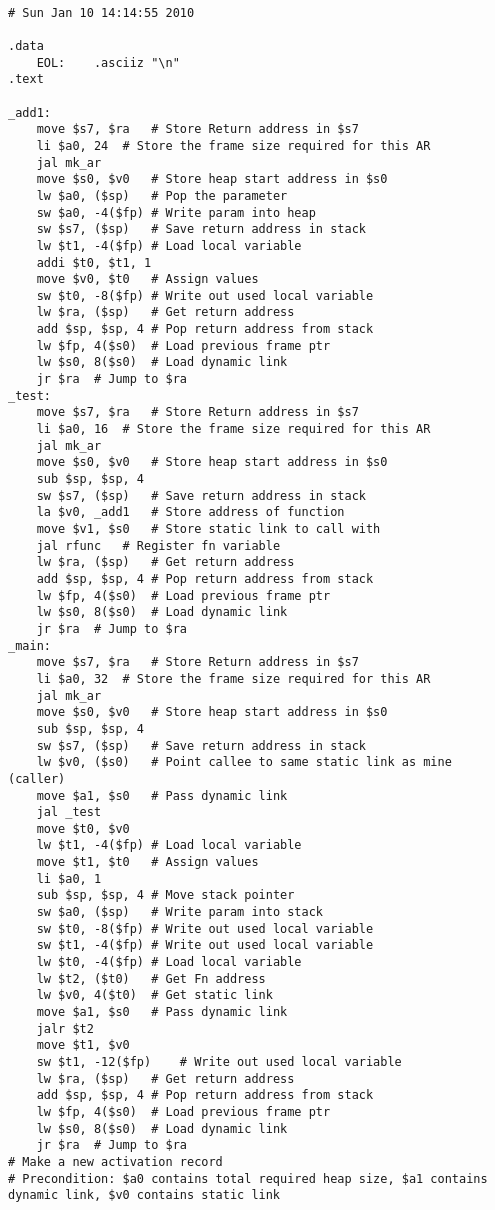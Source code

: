 \begin{lstlisting}[showstringspaces=false,breaklines=true,backgroundcolor=\color{light-gray}, captionpos=b]
         
# Sun Jan 10 14:14:55 2010

.data
	EOL:	.asciiz "\n"
.text

_add1:
	move $s7, $ra	# Store Return address in $s7
	li $a0, 24	# Store the frame size required for this AR
	jal mk_ar
	move $s0, $v0	# Store heap start address in $s0
	lw $a0, ($sp)	# Pop the parameter
	sw $a0, -4($fp)	# Write param into heap
	sw $s7, ($sp)	# Save return address in stack
	lw $t1, -4($fp)	# Load local variable
	addi $t0, $t1, 1
	move $v0, $t0	# Assign values
	sw $t0, -8($fp)	# Write out used local variable
	lw $ra, ($sp)	# Get return address
	add $sp, $sp, 4	# Pop return address from stack
	lw $fp, 4($s0)	# Load previous frame ptr
	lw $s0, 8($s0)	# Load dynamic link
	jr $ra	# Jump to $ra
_test:
	move $s7, $ra	# Store Return address in $s7
	li $a0, 16	# Store the frame size required for this AR
	jal mk_ar
	move $s0, $v0	# Store heap start address in $s0
	sub $sp, $sp, 4
	sw $s7, ($sp)	# Save return address in stack
	la $v0, _add1	# Store address of function
	move $v1, $s0	# Store static link to call with
	jal rfunc	# Register fn variable
	lw $ra, ($sp)	# Get return address
	add $sp, $sp, 4	# Pop return address from stack
	lw $fp, 4($s0)	# Load previous frame ptr
	lw $s0, 8($s0)	# Load dynamic link
	jr $ra	# Jump to $ra
_main:
	move $s7, $ra	# Store Return address in $s7
	li $a0, 32	# Store the frame size required for this AR
	jal mk_ar
	move $s0, $v0	# Store heap start address in $s0
	sub $sp, $sp, 4
	sw $s7, ($sp)	# Save return address in stack
	lw $v0, ($s0)	# Point callee to same static link as mine (caller)
	move $a1, $s0	# Pass dynamic link
	jal _test
	move $t0, $v0
	lw $t1, -4($fp)	# Load local variable
	move $t1, $t0	# Assign values
	li $a0, 1
	sub $sp, $sp, 4	# Move stack pointer
	sw $a0, ($sp)	# Write param into stack
	sw $t0, -8($fp)	# Write out used local variable
	sw $t1, -4($fp)	# Write out used local variable
	lw $t0, -4($fp)	# Load local variable
	lw $t2, ($t0)	# Get Fn address
	lw $v0, 4($t0)	# Get static link
	move $a1, $s0	# Pass dynamic link
	jalr $t2
	move $t1, $v0
	sw $t1, -12($fp)	# Write out used local variable
	lw $ra, ($sp)	# Get return address
	add $sp, $sp, 4	# Pop return address from stack
	lw $fp, 4($s0)	# Load previous frame ptr
	lw $s0, 8($s0)	# Load dynamic link
	jr $ra	# Jump to $ra
# Make a new activation record
# Precondition: $a0 contains total required heap size, $a1 contains dynamic link, $v0 contains static link

\end{lstlisting}
